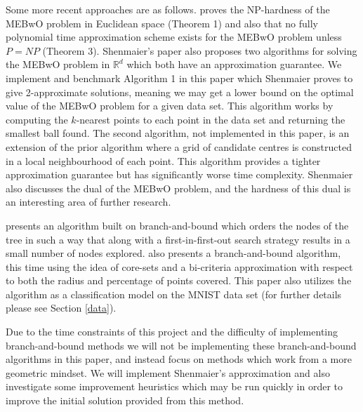 \documentclass[11pt,twoside]{report}
\theoremstyle{definition}
\numberwithin{theorem}{section}
\numberwithin{definition}{section}
\numberwithin{lemma}{section}
\numberwithin{proposition}{section}
\numberwithin{equation}{section}
\numberwithin{figure}{section}
\begin{document}
Some more recent approaches are as follows. \cite{SHENMAIER201581} proves the NP-hardness of the MEBwO problem in Euclidean space (Theorem 1) and also that no fully polynomial time approximation scheme exists for the MEBwO problem unless $P=NP$ (Theorem 3). Shenmaier's paper also proposes two algorithms for solving the MEBwO problem in $\mathbb{R}^d$ which both have an approximation guarantee. We implement and benchmark Algorithm 1 in this paper which Shenmaier proves to give 2-approximate solutions, meaning we may get a lower bound on the optimal value of the MEBwO problem for a given data set. This algorithm works by computing the $k$-nearest points to each point in the data set and returning the smallest ball found. The second algorithm, not implemented in this paper, is an extension of the prior algorithm where a grid of candidate centres is constructed in a local neighbourhood of each point. This algorithm provides a tighter approximation guarantee but has significantly worse time complexity. Shenmaier also discusses the dual of the MEBwO problem, and the hardness of this dual is an interesting area of further research.

\cite{cavaleiro} presents an algorithm built on branch-and-bound \cite{bnb} which orders the nodes of the tree in such a way that along with a first-in-first-out search strategy results in a small number of nodes explored. \cite{huding} also presents a branch-and-bound algorithm, this time using the idea of core-sets and a bi-criteria approximation with respect to both the radius and percentage of points covered. This paper also utilizes the algorithm as a classification model on the MNIST \cite{lecun2010mnist} data set (for further details please see Section \ref{data}).

Due to the time constraints of this project and the difficulty of implementing branch-and-bound methods we will not be implementing these branch-and-bound algorithms in this paper, and instead focus on methods which work from a more geometric mindset. We will implement Shenmaier's approximation and also investigate some improvement heuristics which may be run quickly in order to improve the initial solution provided from this method.








\end{document}
